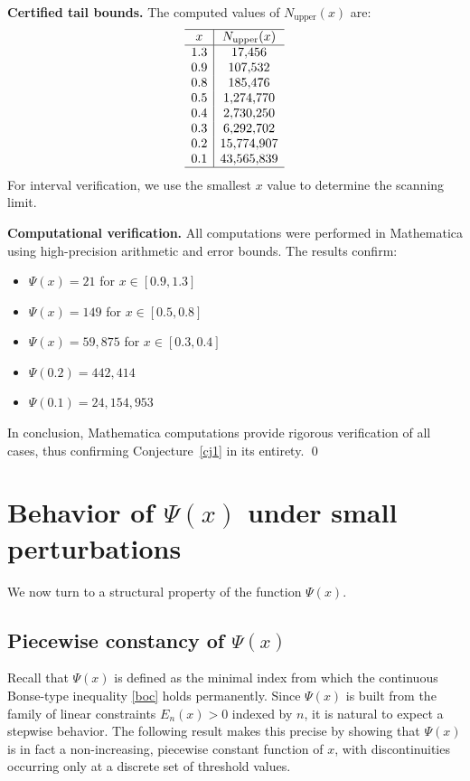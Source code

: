 \documentclass[10pt]{amsart}
\theoremstyle{definition} %
\numberwithin{equation}{section}
\begin{document}
\medskip
\noindent\textbf{Certified tail bounds.}
The computed values of $N_{\text{upper}}(x)$ are:
\[
\begin{array}{c|c}
\hline
x & N_{\text{upper}}(x) \\ \hline
1.3 & 17{,}456 \\
0.9 & 107{,}532 \\
0.8 & 185{,}476 \\
0.5 & 1{,}274{,}770 \\
0.4 & 2{,}730{,}250 \\
0.3 & 6{,}292{,}702 \\
0.2 & 15{,}774{,}907 \\
0.1 & 43{,}565{,}839 \\
\hline
\end{array}
\]
For interval verification, we use the smallest $x$ value to determine the scanning limit.

\medskip
\noindent\textbf{Computational verification.}
All computations were performed in \textsf{Mathematica} using high-precision arithmetic and error bounds. The results confirm:
\begin{itemize}
\item[(i)] $\Psi(x) = 21$ for $x \in [0.9, 1.3]$
\item[(ii)] $\Psi(x) = 149$ for $x \in [0.5, 0.8]$
\item[(iii)] $\Psi(x) = 59{,}875$ for $x \in [0.3, 0.4]$
\item[(iv)] $\Psi(0.2) = 442{,}414$
\item[(v)] $\Psi(0.1) = 24{,}154{,}953$
\end{itemize}

In conclusion, \textsf{Mathematica} computations provide rigorous verification of all cases, thus confirming Conjecture~\ref{cj1} in its entirety. \qed

\section{Behavior of $\Psi(x)$ under small perturbations}\label{piecewise}

We now turn to a structural property of the function $\Psi(x)$.  

\subsection{Piecewise constancy of $\Psi(x)$}

Recall that $\Psi(x)$ is defined as the minimal index from which the 
continuous Bonse-type inequality \eqref{boc} holds permanently.  
Since $\Psi(x)$ is built from the family of linear constraints 
$E_n(x)>0$ indexed by $n$, it is natural to expect a stepwise behavior.  
The following result makes this precise by showing that $\Psi(x)$ 
is in fact a non-increasing, piecewise constant function of $x$, 
with discontinuities occurring only at a discrete set of threshold values.
\end{document}

